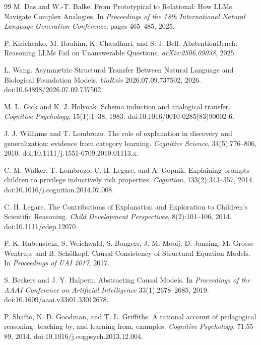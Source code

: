 \begin{thebibliography}{99}
M. Das and W.-T. Balke. From Prototypical to Relational: How LLMs Navigate Complex Analogies. In \emph{Proceedings of the 18th International Natural Language Generation Conference}, pages 465--485, 2025.

P. Kirichenko, M. Ibrahim, K. Chaudhuri, and S. J. Bell. AbstentionBench: Reasoning LLMs Fail on Unanswerable Questions. \emph{arXiv:2506.09038}, 2025.

L. Wang. Asymmetric Structural Transfer Between Natural Language and Biological Foundation Models. \emph{bioRxiv} 2026.07.09.737502, 2026. doi:10.64898/2026.07.09.737502.


M. L. Gick and K. J. Holyoak. Schema induction and analogical transfer. \emph{Cognitive Psychology}, 15(1):1--38, 1983. doi:10.1016/0010-0285(83)90002-6.

J. J. Williams and T. Lombrozo. The role of explanation in discovery and generalization: evidence from category learning. \emph{Cognitive Science}, 34(5):776--806, 2010. doi:10.1111/j.1551-6709.2010.01113.x.

C. M. Walker, T. Lombrozo, C. H. Legare, and A. Gopnik. Explaining prompts children to privilege inductively rich properties. \emph{Cognition}, 133(2):343--357, 2014. doi:10.1016/j.cognition.2014.07.008.

C. H. Legare. The Contributions of Explanation and Exploration to Children's Scientific Reasoning. \emph{Child Development Perspectives}, 8(2):101--106, 2014. doi:10.1111/cdep.12070.

P. K. Rubenstein, S. Weichwald, S. Bongers, J. M. Mooij, D. Janzing, M. Grosse-Wentrup, and B. Sch\"olkopf. Causal Consistency of Structural Equation Models. In \emph{Proceedings of UAI 2017}, 2017.

S. Beckers and J. Y. Halpern. Abstracting Causal Models. In \emph{Proceedings of the AAAI Conference on Artificial Intelligence} 33(1):2678--2685, 2019. doi:10.1609/aaai.v33i01.33012678.

P. Shafto, N. D. Goodman, and T. L. Griffiths. A rational account of pedagogical reasoning: teaching by, and learning from, examples. \emph{Cognitive Psychology}, 71:55--89, 2014. doi:10.1016/j.cogpsych.2013.12.004.


\end{thebibliography}
